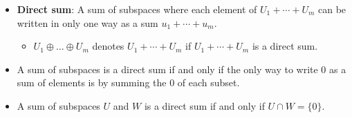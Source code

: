 \documentclass[../main.tex]{subfiles}
\begin{document}
\begin{itemize}
\begin{itemize}
    \end{itemize}
    \item \textbf{Direct sum}: A sum of subspaces where each element of $U_1+\cdots+U_m$ can be written in only one way as a sum $u_1+\cdots+u_m$.
    \begin{itemize}
        \item $U_1\oplus\dots\oplus U_m$ denotes $U_1+\cdots+U_m$ if $U_1+\cdots+U_m$ is a direct sum.
    \end{itemize}
    \item A sum of subspaces is a direct sum if and only if the only way to write $0$ as a sum of elements is by summing the $0$ of each subset.
    \item A sum of subspaces $U$ and $W$ is a direct sum if and only if $U\cap W=\{0\}$.
\end{itemize}
\end{document}
